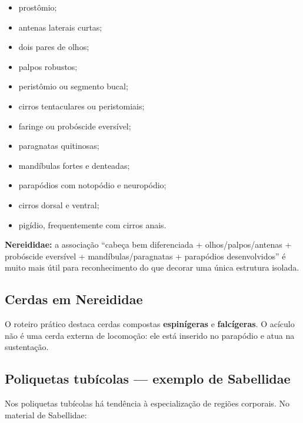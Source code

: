 \documentclass[a4paper,12pt]{article}
\newcommand{\termo}[1]{\textbf{#1}}
\begin{document}
\begin{itemize}
  \item prostômio;
  \item antenas laterais curtas;
  \item dois pares de olhos;
  \item palpos robustos;
  \item peristômio ou segmento bucal;
  \item cirros tentaculares ou peristomiais;
  \item faringe ou probóscide eversível;
  \item paragnatas quitinosas;
  \item mandíbulas fortes e denteadas;
  \item parapódios com notopódio e neuropódio;
  \item cirros dorsal e ventral;
  \item pigídio, frequentemente com cirros anais.
\end{itemize}

\begin{pontoprova}
\textbf{Nereididae:} a associação ``cabeça bem diferenciada + olhos/palpos/antenas + probóscide eversível + mandíbulas/paragnatas + parapódios desenvolvidos'' é muito mais útil para reconhecimento do que decorar uma única estrutura isolada.
\end{pontoprova}

\subsection{Cerdas em Nereididae}

O roteiro prático destaca cerdas compostas \termo{espinígeras} e \termo{falcígeras}. O acículo não é uma cerda externa de locomoção: ele está inserido no parapódio e atua na sustentação.

\subsection{Poliquetas tubícolas — exemplo de Sabellidae}

Nos poliquetas tubícolas há tendência à especialização de regiões corporais. No material de Sabellidae:
\end{document}
